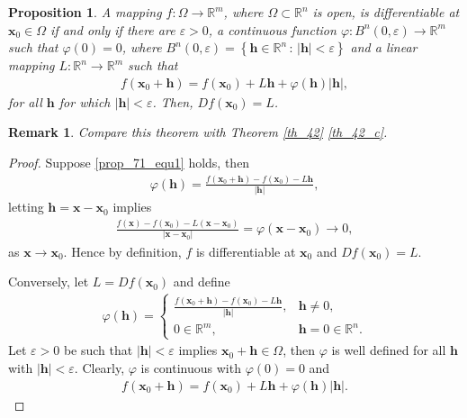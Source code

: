 \documentclass[11pt]{book}
\newtheorem{proposition}{Proposition}[chapter]
\newtheorem{remark}{Remark}[chapter]
\theoremstyle{definition}
\numberwithin{equation}{chapter}
\begin{document}
\begin{proposition}\label{prop_71}
A mapping $f: \Omega \to \mathbb{R}^m$, where $\Omega \subset \mathbb{R}^n$ is open, is differentiable at $\mathbf{x}_0 \in \Omega$ if and only if there are $\varepsilon > 0$, a continuous function $\varphi: B^n(0,\varepsilon) \to \mathbb{R}^m$ such that $\varphi(0) = 0$, where $B^n(0,\varepsilon) = \left\{\mathbf{h} \in \mathbb{R}^n \,:\, \left|\mathbf{h}\right| < \varepsilon\right\}$ and a linear mapping $L: \mathbb{R}^n \to \mathbb{R}^m$ such that
\begin{align}\label{prop_71_equ1}
    f(\mathbf{x}_0 + \mathbf{h}) = f(\mathbf{x}_0) + L\mathbf{h} + \varphi(\mathbf{h}) \left|\mathbf{h}\right|,
\end{align}
for all $\mathbf{h}$ for which $\left|\mathbf{h}\right| < \varepsilon$. Then, $Df(\mathbf{x}_0) = L$.
\end{proposition}
\begin{remark}
Compare this theorem with Theorem \ref{th_42} \ref{th_42_c}.
\end{remark}
\begin{proof}
Suppose \ref{prop_71_equ1} holds, then
\begin{align*}
    \varphi(\mathbf{h}) = \frac{f(\mathbf{x}_0 + \mathbf{h}) - f(\mathbf{x}_0) - L\mathbf{h}}{\left|\mathbf{h}\right|},
\end{align*}
letting $\mathbf{h} = \mathbf{x} - \mathbf{x}_0$ implies
\begin{align*}
    \frac{f(\mathbf{x}) - f(\mathbf{x}_0) - L(\mathbf{x} - \mathbf{x}_0)}{\left|\mathbf{x} - \mathbf{x}_0\right|} = \varphi(\mathbf{x} - \mathbf{x}_0) \to 0,
\end{align*}
as $\mathbf{x} \to \mathbf{x}_0$. Hence by definition, $f$ is differentiable at $\mathbf{x}_0$ and $Df(\mathbf{x}_0) = L$.

Conversely, let $L = Df(\mathbf{x}_0)$ and define 
\begin{align*}
    \varphi(\mathbf{h}) = \begin{cases}
        \frac{f(\mathbf{x}_0 + \mathbf{h}) - f(\mathbf{x}_0) - L\mathbf{h}}{\left|\mathbf{h}\right|}, & \mathbf{h} \neq 0, \\
        0 \in \mathbb{R}^m, & \mathbf{h} = 0 \in \mathbb{R}^n.
    \end{cases}
\end{align*}
Let $\varepsilon > 0$ be such that $\left|\mathbf{h}\right| < \varepsilon$ implies $\mathbf{x}_0 + \mathbf{h} \in \Omega$, then $\varphi$ is well defined for all $\mathbf{h}$ with $\left|\mathbf{h}\right| < \varepsilon$. Clearly, $\varphi$ is continuous with $\varphi(0) = 0$ and
\begin{align*}
    f(\mathbf{x}_0 + \mathbf{h}) = f(\mathbf{x}_0) + L\mathbf{h} + \varphi(\mathbf{h}) \left|\mathbf{h}\right|.
\end{align*}
\end{proof}
\end{document}
